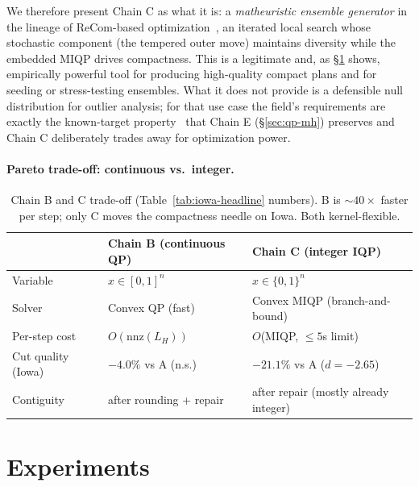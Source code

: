 \documentclass[11pt]{article}
\begin{document}
We therefore present Chain C as what it is: a \emph{matheuristic
ensemble generator} in the lineage of ReCom-based
optimization~\cite{cannon2023voting,brous2025recom}, an iterated
local search whose stochastic component (the tempered outer move)
maintains diversity while the embedded MIQP drives compactness. This
is a legitimate and, as \S\ref{sec:experiments} shows, empirically
powerful tool for producing high-quality compact plans and for
seeding or stress-testing ensembles. What it does not provide is a
defensible null distribution for outlier analysis; for that use case
the field's requirements are exactly the known-target
property~\cite{cannon2022spanning,mccartan2023sequential} that
Chain E (\S\ref{sec:qp-mh}) preserves and Chain C deliberately trades
away for optimization power.

\paragraph{Pareto trade-off: continuous vs.\ integer.}\label{sec:iqp-pareto}

\begin{table}[H]
\centering
\small
\begin{tabular}{lll}
\toprule
 & Chain B (continuous QP) & Chain C (integer IQP) \\
\midrule
Variable & $x \in [0,1]^n$ & $x \in \{0,1\}^n$ \\
Solver & Convex QP (fast) & Convex MIQP (branch-and-bound) \\
Per-step cost & $O(\text{nnz}(L_H))$ & $O$(MIQP, $\le 5$s limit) \\
Cut quality (Iowa) & $-4.0\%$ vs A (n.s.) & $-21.1\%$ vs A ($d = -2.65$) \\
Contiguity & after rounding + repair & after repair (mostly already integer) \\
\bottomrule
\end{tabular}
\caption{Chain B and C trade-off (Table~\ref{tab:iowa-headline}
  numbers). B is $\sim 40\times$ faster per step; only C moves the
  compactness needle on Iowa. Both kernel-flexible.}\label{tab:b-vs-c}
\end{table}

\section{Experiments}\label{sec:experiments}
\end{document}
